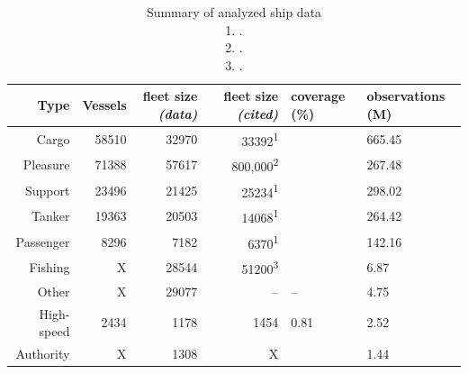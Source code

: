 \begin{table}[htbp]
  \begin{tabular}{rrrrll} %
    \hline
    Type & Vessels & fleet size \textit{(data)} & fleet size \textit{(cited)} & coverage (\%) & observations (M) \\
    \hline
    Cargo & 58510 & 32970 & 33392\textsuperscript{1} & & 665.45 \\
    Pleasure & 71388 & 57617 & ~800,000\textsuperscript{2} & & 267.48 \\
    Support & 23496 & 21425 & 25234\textsuperscript{1} & & 298.02 \\
    Tanker & 19363 & 20503 & 14068\textsuperscript{1} & & 264.42 \\
    Passenger & 8296 & 7182 & 6370\textsuperscript{1} & & 142.16 \\
    Fishing & X & 28544 & 51200\textsuperscript{3} & & 6.87 \\
    Other & X & 29077 & -- & -- & 4.75 \\
    High-speed & 2434 & 1178 & 1454 & 0.81 & 2.52 \\
    Authority & X & 1308 & X & & 1.44 \\
  \end{tabular}
  \caption{Summary of analyzed ship data\\
  1. \cite{Equasis2011}.\\
  2. \cite{westwood2001global}.\\
  3. \cite{FAOfishing}.}
  \label{table:ships-by-type}
\end{table}



